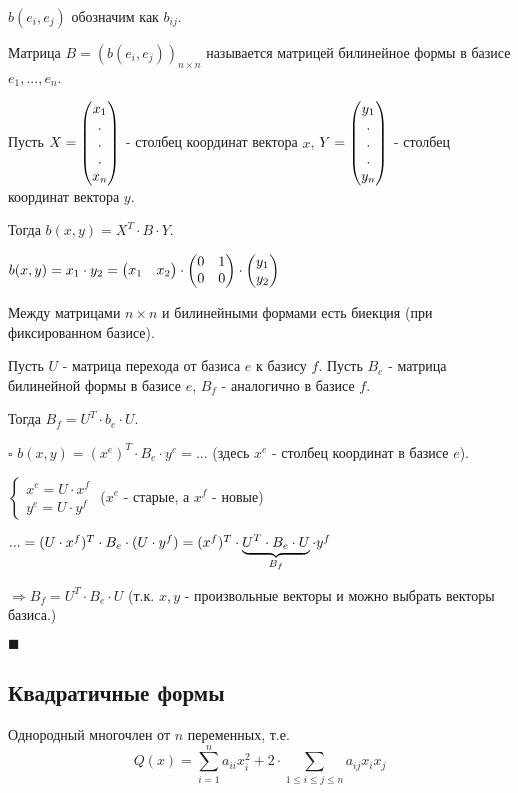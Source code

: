 \documentclass[../main.tex]{subfiles}
\begin{document}
$b(e_i,e_j)$ обозначим как $b_{ij}$.

\void{} Матрица $B = (b(e_i,e_j))_{n\times n}$ называется матрицей билинейное формы в базисе $e_1,...,e_n$.

\void{} Пусть $X = \begin{pmatrix} x_1\\.\\.\\.\\x_n\end{pmatrix}$ - столбец координат вектора $x$, $Y = \begin{pmatrix} y_1\\.\\.\\.\\y_n\end{pmatrix}$ -
столбец координат вектора $y$.

Тогда $b(x, y) = X^T\cdot B\cdot Y$.

\void{} $b(x, y) = x_1\cdot y_2 = \begin{pmatrix} x_1 & x_2\end{pmatrix}\cdot\begin{pmatrix} 0 & 1\\ 0 & 0\end{pmatrix}\cdot\begin{pmatrix} y_1\\y_2\end{pmatrix}$

\void{} Между матрицами $n\times n$ и билинейными формами есть биекция (при фиксированном базисе).

\void{} Пусть $U$ - матрица перехода от базиса $e$ к базису $f$. Пусть $B_e$ - матрица билинейной формы
в базисе $e$, $B_f$ - аналогично в базисе $f$.

Тогда $B_f = U^T\cdot b_e\cdot U$.

\void $\square$ $b(x,y) = (x^e)^T\cdot B_e\cdot y^e = ...$ (здесь $x^e$ - столбец координат в базисе $e$).

$\left\{ \begin{matrix} x^e = U\cdot x^f\\ y^e = U\cdot y^f \end{matrix} \right.$ ($x^e$ - старые, а $x^f$ - новые)

$... = (U\cdot x^f)^T\cdot B_e\cdot (U\cdot y^f) = (x^f)^T\cdot \underbrace{U^T\cdot B_e\cdot U}_{B_f}\cdot y^f$

$\Longrightarrow B_f = U^T\cdot B_e\cdot U$ (т.к. $x, y$ - произвольные векторы и можно выбрать векторы базиса.)

$\blacksquare$

\subsection{Квадратичные формы}

\void{} Однородный многочлен от $n$ переменных, т.е.
$$Q(x) = \sum_{i=1}^n a_{ii} x_i^2 + 2\cdot\sum_{1\leq i\leq j\leq n} a_{ij} x_i x_j$$
\end{document}
